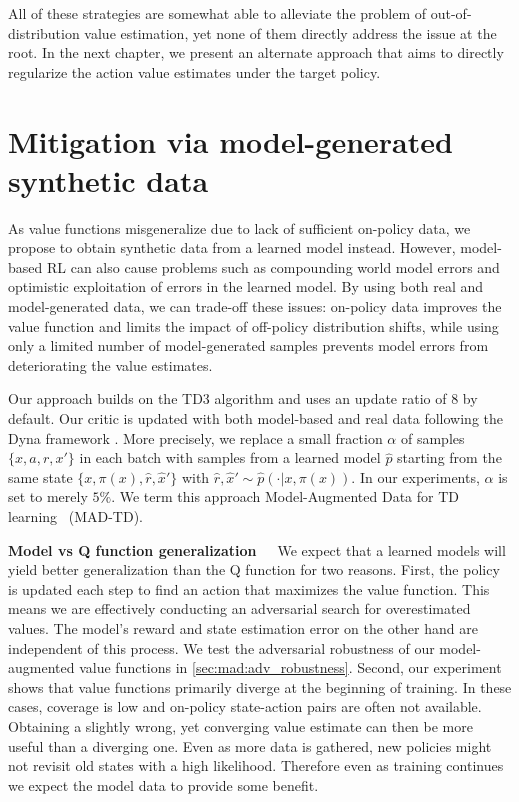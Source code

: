 All of these strategies are somewhat able to alleviate the problem of out-of-distribution value estimation, yet none of them directly address the issue at the root.
In the next chapter, we present an alternate approach that aims to directly regularize the action value estimates under the target policy.

\section{Mitigation via model-generated synthetic data}

As value functions misgeneralize due to lack of sufficient on-policy data, we propose to obtain synthetic data from a learned model instead.
However, model-based RL can also cause problems such as compounding world model errors and optimistic exploitation of errors in the learned model. 
By using both real and model-generated data, we can trade-off these issues: on-policy data improves the value function and limits the impact of off-policy distribution shifts, while using only a limited number of model-generated samples prevents model errors from deteriorating the value estimates. 

Our approach builds on the TD3 algorithm \parencite{fujimoto2018addressing} and uses an update ratio of 8 by default. 
Our critic is updated with both model-based and real data following the Dyna framework \parencite{dyna}.
More precisely, we replace a small fraction $\alpha$ of samples $\{x,a,r,x'\}$ in each batch with samples from a learned model $\hat{p}$ starting from the same state $\{x, \pi(x), \hat{r} ,\hat{x}'\}$ with $\hat{r}, \hat{x}' \sim \hat{p}(\cdot|x, \pi(x))$. In our experiments, $\alpha$ is set to merely $5\%$.
We term this approach Model-Augmented Data for TD learning ~(MAD-TD).%

\textbf{Model vs Q function generalization}~~~We expect that a learned models will yield better generalization than the Q function for two reasons.
First, the policy is updated each step to find an action that maximizes the value function.
This means we are effectively conducting an adversarial search for overestimated values.
The model's reward and state estimation error on the other hand are independent of this process.
We test the adversarial robustness of our model-augmented value functions in \autoref{sec:mad:adv_robustness}.
Second, our experiment shows that value functions primarily diverge at the beginning of training.
In these cases, coverage is low and on-policy state-action pairs are often not available.
Obtaining a slightly wrong, yet converging value estimate can then be more useful than a diverging one. 
Even as more data is gathered, new policies might not revisit old states with a high likelihood.
Therefore even as training continues we expect the model data to provide some benefit.

